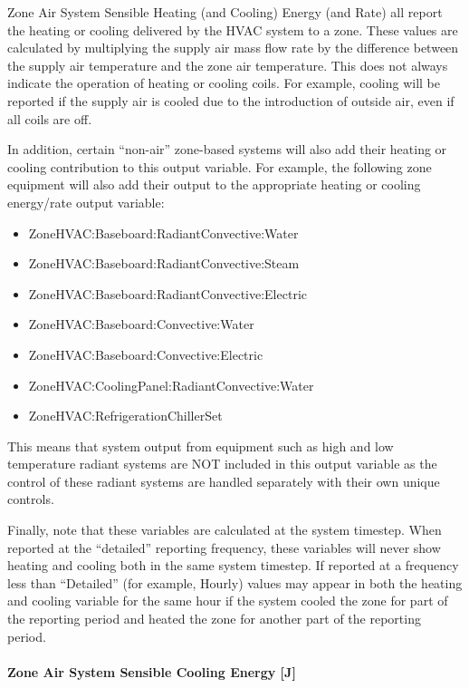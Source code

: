 \begin{callout}
Zone Air System Sensible Heating (and Cooling) Energy (and Rate) all report the heating or cooling delivered by the HVAC system to a zone. These values are calculated by multiplying the supply air mass flow rate by the difference between the supply air temperature and the zone air temperature. This does not always indicate the operation of heating or cooling coils. For example, cooling will be reported if the supply air is cooled due to the introduction of outside air, even if all coils are off.

In addition, certain ``non-air'' zone-based systems will also add their heating or cooling contribution to this output variable.  For example, the following zone equipment will also add their output to the appropriate heating or cooling energy/rate output variable:

\begin{itemize}
\item
ZoneHVAC:Baseboard:RadiantConvective:Water
\item
ZoneHVAC:Baseboard:RadiantConvective:Steam
\item
ZoneHVAC:Baseboard:RadiantConvective:Electric
\item
ZoneHVAC:Baseboard:Convective:Water
\item
ZoneHVAC:Baseboard:Convective:Electric
\item
ZoneHVAC:CoolingPanel:RadiantConvective:Water
\item
ZoneHVAC:RefrigerationChillerSet
\end{itemize}

This means that system output from equipment such as high and low temperature radiant systems are NOT included in this output variable as the control of these radiant systems are handled separately with their own unique controls.

Finally, note that these variables are calculated at the system timestep. When reported at the ``detailed'' reporting frequency, these variables will never show heating and cooling both in the same system timestep. If reported at a frequency less than ``Detailed'' (for example, Hourly) values may appear in both the heating and cooling variable for the same hour if the system cooled the zone for part of the reporting period and heated the zone for another part of the reporting period.
\end{callout}

\paragraph{Zone Air System Sensible Cooling Energy {[}J{]}}\label{zone-air-system-sensible-cooling-energy-j}

